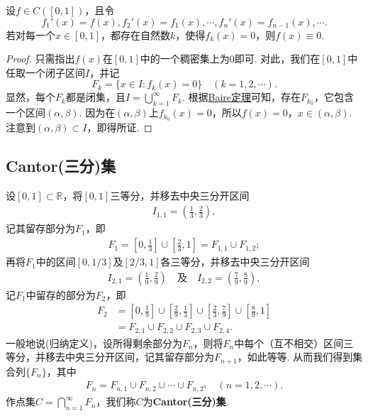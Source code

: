 \documentclass[../../main.tex]{subfiles}
\begin{document}
\begin{example}\label{example:例16}
设$f\in C([0,1])$，且令
\[
f_1'(x)=f(x), f_2'(x)=f_1(x), \cdots, f_n'(x)=f_{n - 1}(x), \cdots.
\]
若对每一个$x\in[0,1]$，都存在自然数$k$，使得$f_k(x)=0$，则$f(x)\equiv0$.
\end{example}
\begin{proof}
只需指出$f(x)$在$[0,1]$中的一个稠密集上为$0$即可. 对此，我们在$[0,1]$中任取一个闭子区间$I$，并记
\[
F_k=\{x\in I: f_k(x)=0\} \quad (k = 1,2,\cdots).
\]
显然，每个$F_k$都是闭集，且$I=\bigcup_{k = 1}^{\infty}F_k$. 根据\hyperref[theorem:Baire定理]{Baire定理}可知，存在$F_{k_0}$，它包含一个区间$(\alpha,\beta)$. 因为在$(\alpha,\beta)$上$f_{k_0}(x)=0$，所以$f(x)=0$，$x\in(\alpha,\beta)$. 注意到$(\alpha,\beta)\subset I$，即得所证. 
\end{proof}



\subsection{Cantor(三分)集}

\begin{definition}
设$[0,1]\subset\mathbb{R}$，将$[0,1]$三等分，并移去中央三分开区间
\begin{align*}
I_{1,1}=\left(\frac{1}{3},\frac{2}{3}\right),
\end{align*}
记其留存部分为$F_1$，即
\begin{align*}
F_1=\left[0,\frac{1}{3}\right]\cup\left[\frac{2}{3},1\right]=F_{1,1}\cup F_{1,2};
\end{align*}
再将$F_1$中的区间$[0,1/3]$及$[2/3,1]$各三等分，并移去中央三分开区间
\begin{align*}
I_{2,1}=\left(\frac{1}{9},\frac{2}{9}\right) \quad \text{及} \quad I_{2,2}=\left(\frac{7}{9},\frac{8}{9}\right),
\end{align*}
记$F_1$中留存的部分为$F_2$，即
\begin{align*}
F_2&=\left[0,\frac{1}{9}\right]\cup\left[\frac{2}{9},\frac{1}{3}\right]\cup\left[\frac{2}{3},\frac{7}{9}\right]\cup\left[\frac{8}{9},1\right]\\
&=F_{2,1}\cup F_{2,2}\cup F_{2,3}\cup F_{2,4}.
\end{align*}
一般地说(归纳定义)，设所得剩余部分为$F_n$，则将$F_n$中每个（互不相交）区间三等分，并移去中央三分开区间，记其留存部分为$F_{n + 1}$，如此等等. 从而我们得到集合列$\{F_n\}$，其中
\begin{align*}
F_n=F_{n,1}\cup F_{n,2}\cup\cdots\cup F_{n,2^n} \quad (n = 1,2,\cdots).
\end{align*}
作点集$C = \bigcap_{n = 1}^{\infty}F_n$，我们称$C$为\textbf{Cantor(三分)集}. 
\end{definition}
\end{document}
